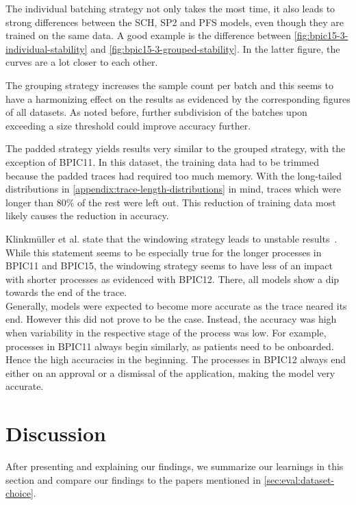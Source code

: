 The individual batching strategy not only takes the most time, it also leads to strong differences between the SCH, SP2 and PFS models, even though they are trained on the same data. A good example is the difference between \autoref{fig:bpic15-3-individual-stability} and \autoref{fig:bpic15-3-grouped-stability}. In the latter figure, the curves are a lot closer to each other.

The grouping strategy increases the sample count per batch and this seems to have a harmonizing effect on the results as evidenced by the corresponding figures of all datasets. As noted before, further subdivision of the batches upon exceeding a size threshold could improve accuracy further.

The padded strategy yields results very similar to the grouped strategy, with the exception of BPIC11. In this dataset, the training data had to be trimmed because the padded traces had required too much memory. With the long-tailed distributions in \autoref{appendix:trace-length-distributions} in mind, traces which were longer than $80\%$ of the rest were left out. This reduction of training data most likely causes the reduction in accuracy.

Klinkmüller et al. state that the windowing strategy leads to unstable results~\cite{klinkmuller2018reliablemonitoring}. While this statement seems to be especially true for the longer processes in BPIC11 and BPIC15, the windowing strategy seems to have less of an impact with shorter processes as evidenced with BPIC12. There, all models show a dip towards the end of the trace.\\

Generally, models were expected to become more accurate as the trace neared its end. However this did not prove to be the case. Instead, the accuracy was high when variability in the respective stage of the process was low. For example, processes in BPIC11 always begin similarly, as patients need to be onboarded. Hence the high accuracies in the beginning. The processes in BPIC12 always end either on an approval or a dismissal of the application, making the model very accurate.

\section{Discussion}
\label{sec:eval:discussion}
After presenting and explaining our findings, we summarize our learnings in this section and compare our findings to the papers mentioned in \autoref{sec:eval:dataset-choice}.\\

